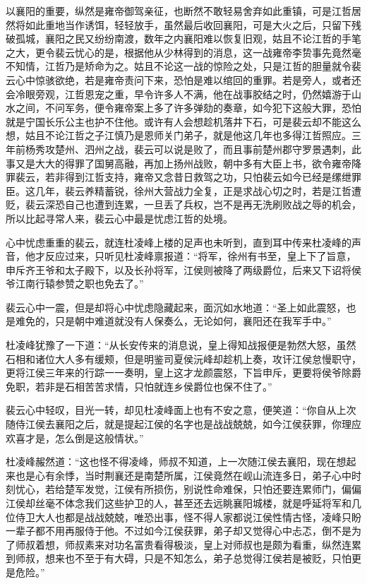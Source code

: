 以襄阳的重要，纵然是雍帝御驾亲征，也断然不敢轻易舍弃如此重镇，可是江哲居然将如此重地当作诱饵，轻轻放手，虽然最后收回襄阳，可是大火之后，只留下残破孤城，襄阳之民又纷纷南渡，数年之内襄阳难以恢复旧观，姑且不论江哲的手笔之大，更令裴云忧心的是，根据他从少林得到的消息，这一战雍帝李贽事先竟然毫不知情，江哲乃是矫命为之。姑且不论这一战的惊险之处，只是江哲的胆量就令裴云心中惊骇欲绝，若是雍帝责问下来，恐怕是难以绾回的重罪。若是旁人，或者还会冷眼旁观，江哲恩宠之重，早令许多人不满，他在战事胶结之时，仍然嬉游于山水之间，不问军务，便令雍帝案上多了许多弹劾的奏章，如今犯下这般大罪，恐怕就是宁国长乐公主也护不住他。或许有人会想趁机落井下石，可是裴云却不能这么想，姑且不论江哲之子江慎乃是恩师关门弟子，就是他这几年也多得江哲照应。三年前杨秀攻楚州、泗州之战，裴云可以说是败了，而且事前楚州郡守罗景遇刺，此事又是大大的得罪了国舅高融，再加上扬州战败，朝中多有大臣上书，欲令雍帝降罪裴云，若非得到江哲支持，雍帝又念昔日救驾之功，只怕裴云如今已经是缧绁罪臣。这几年，裴云养精蓄锐，徐州大营战力全复，正是求战心切之时，若是江哲遭贬，裴云深恐自己也遭到连累，一旦丢了兵权，岂不是再无洗刷败战之辱的机会，所以比起寻常人来，裴云心中最是忧虑江哲的处境。

心中忧虑重重的裴云，就连杜凌峰上楼的足声也未听到，直到耳中传来杜凌峰的声音，他才反应过来，只听见杜凌峰禀报道：“将军，徐州有书至，皇上下了旨意，申斥齐王爷和太子殿下，以及长孙将军，江侯则被降了两级爵位，后来又下诏将侯爷江南行辕参赞之职也免去了。”

裴云心中一震，但是却将心中忧虑隐藏起来，面沉如水地道：“圣上如此震怒，也是难免的，只是朝中难道就没有人保奏么，无论如何，襄阳还在我军手中。”

杜凌峰犹豫了一下道：“从长安传来的消息说，皇上得知战报便是勃然大怒，虽然石相和诸位大人多有缓颊，但是明鉴司夏侯沅峰却趁机上奏，攻讦江侯怠慢职守，更将江侯三年来的行踪一一奏明，皇上这才龙颜震怒，下旨申斥，更要将侯爷除爵免职，若非是石相苦苦求情，只怕就连乡侯爵位也保不住了。”

裴云心中轻叹，目光一转，却见杜凌峰面上也有不安之意，便笑道：“你自从上次随侍江侯去襄阳之后，就是提起江侯的名字也是战战兢兢，如今江侯获罪，你理应欢喜才是，怎么倒是这般情状。”

杜凌峰赧然道：“这也怪不得凌峰，师叔不知道，上一次随江侯去襄阳，现在想起来也是心有余悸，当时荆襄还是南楚所属，江侯竟然在岘山流连多日，弟子心中时刻忧心，若给楚军发觉，江侯有所损伤，别说性命难保，只怕还要连累师门，偏偏江侯却丝毫不体念我们这些护卫的人，甚至还去远眺襄阳城楼，就是呼延将军和几位侍卫大人也都是战战兢兢，唯恐出事，怪不得人家都说江侯性情古怪，凌峰只盼一辈子都不用再服侍于他。不过如今江侯获罪，弟子却又觉得心中忐忑，倒不是为了师叔着想，师叔素来对功名富贵看得极淡，皇上对师叔也是颇为看重，纵然连累到师叔，想来也不至于有大碍，只是不知怎么，弟子总觉得江侯若是被贬，只怕更是危险。”

